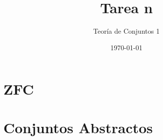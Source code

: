 \documentclass{article}
\title{Tarea n}
\author{Teoría de Conjuntos 1}
\date{\today}
\begin{document}
\maketitle

\section{ZFC}
\kant[1]

\section{Conjuntos Abstractos}
\kant[2]
\end{document}
